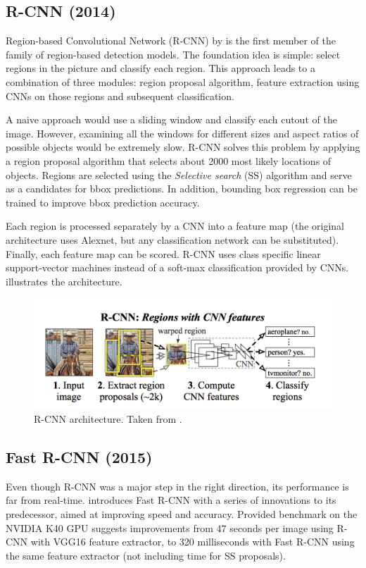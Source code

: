 \subsection{R-CNN (2014)}
Region-based Convolutional Network (R-CNN) by \citeauthor{bib:rcnn} \cite{bib:rcnn} is the first member of the family of region-based detection models. The foundation idea is simple: select regions in the picture and classify each region. This approach leads to a combination of three modules: region proposal algorithm, feature extraction using CNNs on those regions and subsequent classification. 

A naive approach would use a sliding window and classify each cutout of the image. However, examining all the windows for different sizes and aspect ratios of possible objects would be extremely slow. R-CNN solves this problem by applying a region proposal algorithm that selects about 2000 most likely locations of objects. Regions are selected using the \textit{Selective search} (SS) \cite{bib:selectivesearch} algorithm and serve as a candidates for bbox predictions. In addition, bounding box regression can be trained to improve bbox prediction accuracy.

Each region is processed separately by a CNN into a feature map (the original architecture uses Alexnet, but any classification network can be substituted). Finally, each feature map can be scored. R-CNN uses class specific linear support-vector machines instead of a soft-max classification provided by CNNs.  illustrates the architecture.

\begin{figure}
    \centering
    \includegraphics[width=\textwidth]{img/rcnn}
    \caption[R-CNN architecture]%
    {R-CNN architecture. Taken from \cite[fig. 1]{bib:rcnn}.}
    \label{fig:rcnn}
\end{figure}

\subsection{Fast R-CNN (2015)}
Even though R-CNN was a major step in the right direction, its performance is far from real-time. \citeauthor{bib:fastrcnn} \cite{bib:fastrcnn} introduces Fast R-CNN with a series of innovations to its predecessor, aimed at improving speed and accuracy. Provided benchmark on the NVIDIA K40 GPU suggests improvements from 47 seconds per image using R-CNN with VGG16 feature extractor, to 320 milliseconds with Fast R-CNN using the same feature extractor (not including time for SS proposals). 

